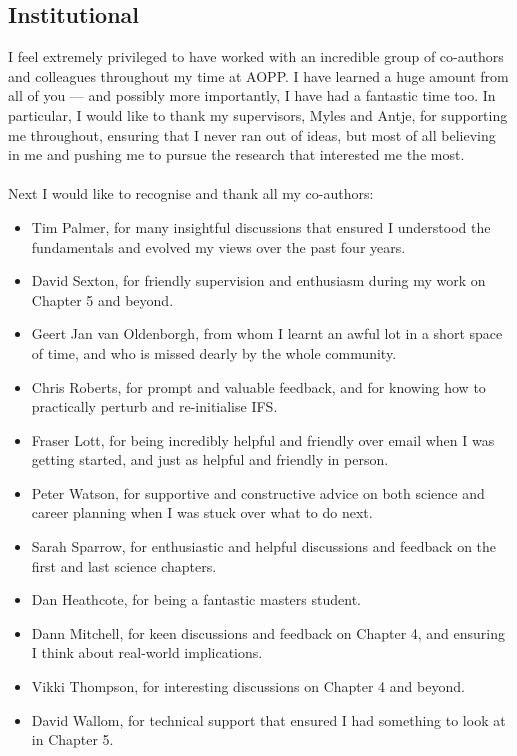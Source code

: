\subsection*{Institutional}
I feel extremely privileged to have worked with an incredible group of co-authors and colleagues throughout my time at AOPP. I have learned a huge amount from all of you --- and possibly more importantly, I have had a fantastic time too. In particular, I would like to thank my supervisors, Myles and Antje, for supporting me throughout, ensuring that I never ran out of ideas, but most of all believing in me and pushing me to pursue the research that interested me the most.\\\\
\noindent Next I would like to recognise and thank all my co-authors:
\begin{itemize}[label={},leftmargin=*]
    \item Tim Palmer, for many insightful discussions that ensured I understood the fundamentals and evolved my views over the past four years.
    \item David Sexton, for friendly supervision and enthusiasm during my work on Chapter 5 and beyond.
    \item Geert Jan van Oldenborgh, from whom I learnt an awful lot in a short space of time, and who is missed dearly by the whole community.
    \item Chris Roberts, for prompt and valuable feedback, and for knowing how to practically perturb and re-initialise IFS.
    \item Fraser Lott, for being incredibly helpful and friendly over email when I was getting started, and just as helpful and friendly in person.
    \item Peter Watson, for supportive and constructive advice on both science and career planning when I was stuck over what to do next.
    \item Sarah Sparrow, for enthusiastic and helpful discussions and feedback on the first and last science chapters.
    \item Dan Heathcote, for being a fantastic masters student.
    \item Dann Mitchell, for keen discussions and feedback on Chapter 4, and ensuring I think about real-world implications.
    \item Vikki Thompson, for interesting discussions on Chapter 4 and beyond.
    \item David Wallom, for technical support that ensured I had something to look at in Chapter 5.
\end{itemize}

